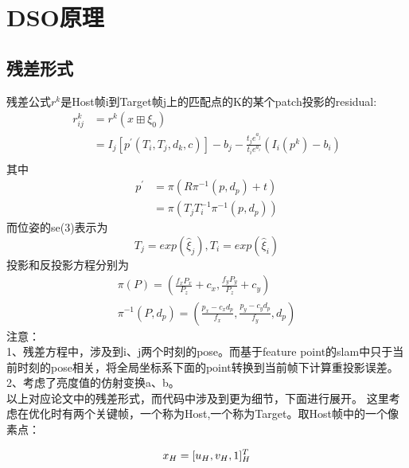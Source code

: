\chapter{DSO原理}

\section{残差形式}	
残差公式$r^k$是Host帧i到Target帧j上的匹配点的K的某个patch投影的residual:
\begin{equation} \label{eq:residual}
\begin{aligned} %
r_{ij}^k &= r^k(x \boxplus \xi_{0})\\
         &= I_{j}[p^{'}(T_{i},T_{j},d_{k},c)]-b_{j}-\frac{t_{j}e^{a_{j}}}{t_{i}e^{a_{i}}}(I_{i}(p^k)-b_{i}) \\ 
\end{aligned}
\end{equation}
其中
\begin{equation}
\begin{aligned} \label{eq:p}
p^{'} &= \pi(R\pi^{-1}(p,d_{p})+t)\\
&= \pi(T_{j}T_{i}^{-1}\pi^{-1}(p,d_{p}))
\end{aligned}
\end{equation}
而位姿的se(3)表示为
\begin{equation}
   T_{j}=exp(\hat{\xi}_{j}),T_{i}=exp(\hat{\xi}_{i})
\end{equation}
投影和反投影方程分别为
\begin{align}
	\pi(P)=(\frac{f_{x}P_{x}}{P_{z}}+c_{x},\frac{f_{y}P_{y}}{P_{z}}+c_{y})\\
	\pi^{-1}(P,d_{p})=(\frac{p_{x}-c_{x}d_{p}}{f_{x}},\frac{p_{y}-c_{y}d_{p}}{f_{y}},d_{p})
\end{align}
注意：\\
1、残差方程中，涉及到i、j两个时刻的pose。而基于feature point的slam中只于当前时刻的pose相关，将全局坐标系下面的point转换到当前帧下计算重投影误差。\\
2、考虑了亮度值的仿射变换a、b。\\

以上对应论文中的残差形式，而代码中涉及到更为细节，下面进行展开。
这里考虑在优化时有两个关键帧，一个称为Host,一个称为Target。取Host帧中的一个像素点：

\begin{equation}
	x_{H}=[u_{H},v_{H},1]_{H}^{T}\\
\end{equation}

